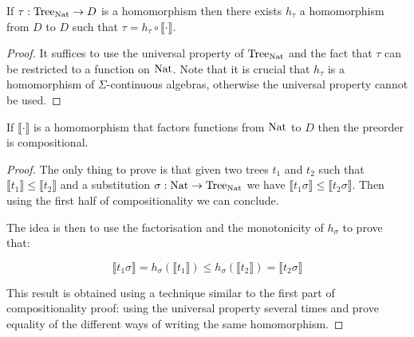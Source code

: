 \begin{acorollary}
    If $\tau : \textnormal{Tree}_{\textnormal{Nat}} \to D$ is a homomorphism 
    then there exists $h_\tau$ a homomorphism
    from $D$ to $D$ such that $\tau = h_\tau \circ \llbracket \cdot \rrbracket$.
\end{acorollary}

\begin{ensps}
\begin{proof}
    It suffices to use the universal property of $\textnormal{Tree}_{\textnormal{Nat}}$ 
    and the fact that $\tau$ can be restricted to a function 
    on $\textnormal{Nat}$. Note that it is crucial that $h_\tau$ is a 
    homomorphism of $\Sigma$-continuous algebras, 
    otherwise the universal property cannot be used.
\end{proof}
\end{ensps}

\begin{alemma}
    If $\llbracket \cdot \rrbracket$ is a homomorphism 
    that factors functions from $\textnormal{Nat}$ to $D$ then 
    the preorder is compositional.
\end{alemma}

\begin{ensps}
\begin{proof}
    The only thing to prove is that given two trees $t_1$ and 
    $t_2$ such that $\llbracket t_1 \rrbracket \leq \llbracket t_2 \rrbracket$
    and a substitution $\sigma : \textnormal{Nat} \to \textnormal{Tree}_{\textnormal{Nat}}$ 
    we have $\llbracket t_1 \sigma \rrbracket \leq \llbracket t_2 \sigma
    \rrbracket$. 
    Then using the first half of compositionality we can conclude.

    The idea is then to use the factorisation and 
    the monotonicity of $h_\sigma$ to prove that:

    \begin{equation*}
        \llbracket t_1 \sigma \rrbracket 
        = h_\sigma (\llbracket t_1 \rrbracket) 
        \leq h_\sigma (\llbracket t_2 \rrbracket)
        = \llbracket t_2 \sigma \rrbracket 
    \end{equation*}

    This result is obtained using a technique similar 
    to the first part of compositionality proof: using 
    the universal property several times and prove 
    equality of the different ways of writing 
    the same homomorphism.

\end{proof}
\end{ensps}

